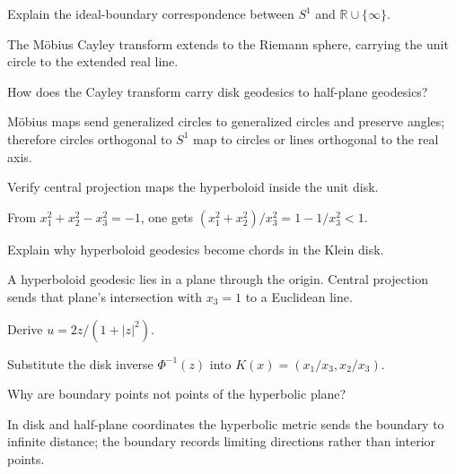 \begin{problem}\label{prob:vii31-05}
Explain the ideal-boundary correspondence between \(S^1\) and \(\mathbb R\cup\{\infty\}\).
\end{problem}
\begin{solution}
The Möbius Cayley transform extends to the Riemann sphere, carrying the unit circle to the extended real line.
\end{solution}

\begin{problem}\label{prob:vii31-06}
How does the Cayley transform carry disk geodesics to half-plane geodesics?
\end{problem}
\begin{solution}
Möbius maps send generalized circles to generalized circles and preserve angles; therefore circles orthogonal to \(S^1\) map to circles or lines orthogonal to the real axis.
\end{solution}

\begin{problem}\label{prob:vii31-07}
Verify central projection maps the hyperboloid inside the unit disk.
\end{problem}
\begin{solution}
From \(x_1^2+x_2^2-x_3^2=-1\), one gets \((x_1^2+x_2^2)/x_3^2=1-1/x_3^2<1\).
\end{solution}

\begin{problem}\label{prob:vii31-08}
Explain why hyperboloid geodesics become chords in the Klein disk.
\end{problem}
\begin{solution}
A hyperboloid geodesic lies in a plane through the origin. Central projection sends that plane's intersection with \(x_3=1\) to a Euclidean line.
\end{solution}

\begin{problem}\label{prob:vii31-09}
Derive \(u=2z/(1+|z|^2)\).
\end{problem}
\begin{solution}
Substitute the disk inverse \(\Phi^{-1}(z)\) into \(K(x)=(x_1/x_3,x_2/x_3)\).
\end{solution}

\begin{problem}\label{prob:vii31-10}
Why are boundary points not points of the hyperbolic plane?
\end{problem}
\begin{solution}
In disk and half-plane coordinates the hyperbolic metric sends the boundary to infinite distance; the boundary records limiting directions rather than interior points.
\end{solution}


